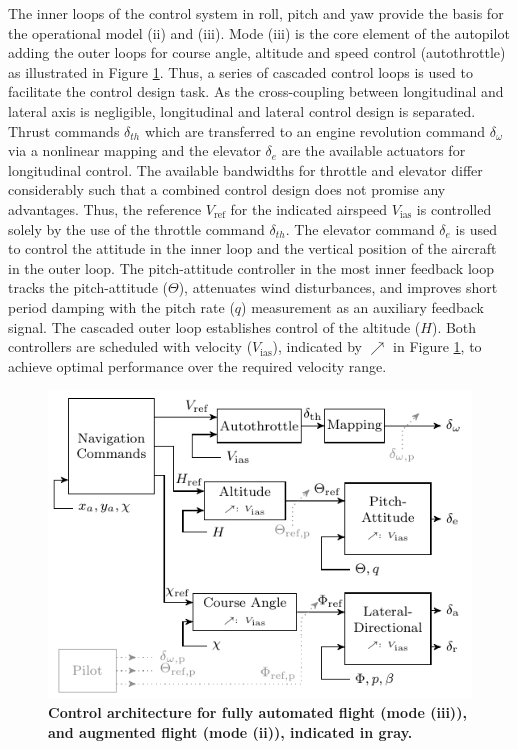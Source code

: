 \documentclass[aerospace,article,submit,moreauthors,pdftex,10pt,a4paper]{Definitions/mdpi}
\begin{document}
The inner loops of the control system in roll, pitch and yaw provide the basis for the operational model (ii) and (iii). Mode (iii) is the core element of the autopilot  adding the outer loops for course angle, altitude and speed control (autothrottle) as illustrated in Figure \ref{fig:arch}. Thus, a series of cascaded control loops is used to facilitate the control design task. As the cross-coupling between longitudinal and lateral axis is negligible, longitudinal and lateral control design is separated.  Thrust commands $\delta_{th}$ which are transferred to an engine revolution command $\delta_{\omega}$ via a nonlinear mapping and the  elevator $\delta_e$ are the available actuators for longitudinal control.
The available bandwidths for throttle and elevator differ considerably such that a combined control design does not promise any advantages. Thus, the reference $V_{\text{ref}}$ for the indicated airspeed $V_{\text{ias}}$ is controlled solely by the use of the throttle command  $\delta_{th}$. The elevator command  $\delta_{e}$ is used to control the attitude in the inner loop and the vertical position of the aircraft in the outer loop. The pitch-attitude controller in the most inner feedback loop tracks the pitch-attitude ($\Theta$), attenuates wind disturbances, and improves short period damping with the pitch rate ($q$) measurement as an auxiliary feedback signal. The cascaded outer loop establishes control of the altitude ($H$). Both controllers are scheduled with velocity ($V_{\text{ias}}$), indicated by $\nearrow$ in Figure \ref{fig:arch}, to achieve optimal performance over the required velocity range.
\begin{figure}[!bhtp]	
	\centering
	\includegraphics[width=0.7\linewidth]{figs/architecture.pdf}
	\caption{\textbf{Control architecture for fully automated flight (mode (iii)), and augmented flight (mode (ii)), indicated in gray.}}
	\label{fig:arch}
\end{figure}
\end{document}
